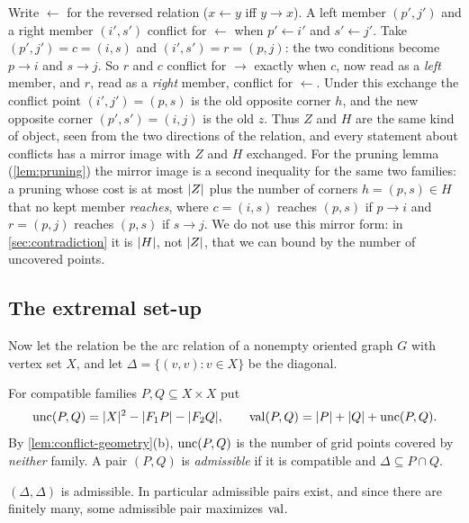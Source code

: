 \begin{remark}\label{rem:reversal}
Write $\leftarrow$ for the reversed relation ($x\leftarrow y$ iff $y\to x$).
A left member $(p',j')$ and a right member $(i',s')$ conflict for
$\leftarrow$ when $p'\leftarrow i'$ and $s'\leftarrow j'$. Take
$(p',j')=c=(i,s)$ and $(i',s')=r=(p,j)$: the two conditions become
$p\to i$ and $s\to j$. So $r$ and $c$ conflict for $\to$ exactly when
$c$, now read as a \emph{left} member, and $r$, read as a \emph{right}
member, conflict for $\leftarrow$. Under this exchange the conflict point
$(i',j')=(p,s)$ is the old opposite corner $h$, and the new opposite corner
$(p',s')=(i,j)$ is the old $z$. Thus $Z$ and $H$ are the same kind of object,
seen from the two directions of the relation, and every statement about
conflicts has a mirror image with $Z$ and $H$ exchanged. For the pruning
lemma (\cref{lem:pruning}) the mirror image is a second inequality for the
same two families: a pruning whose cost is at most $\lvert Z\rvert$ plus the number
of corners $h=(p,s)\in H$ that no kept member \emph{reaches}, where
$c=(i,s)$ reaches $(p,s)$ if $p\to i$ and $r=(p,j)$ reaches $(p,s)$ if
$s\to j$. We do not use this mirror form: in \cref{sec:contradiction} it is
$\lvert H\rvert$, not $\lvert Z\rvert$, that we can bound by the number of uncovered points.
\end{remark}

\subsection{The extremal set-up}

Now let the relation be the arc relation of a nonempty oriented graph $G$
with vertex set $X$, and let $\Delta=\{(v,v):v\in X\}$ be the diagonal.

\begin{definition}\label{def:value}
For compatible families $P,Q\subseteq X\times X$ put
\[
 \operatorname{unc}(P,Q)=\lvert X\rvert^2-\lvert F_1 P\rvert-\lvert F_2 Q\rvert,\qquad
 \operatorname{val}(P,Q)=\lvert P\rvert+\lvert Q\rvert+\operatorname{unc}(P,Q).
\]
By \cref{lem:conflict-geometry}(b), $\operatorname{unc}(P,Q)$ is the number of grid points
covered by \emph{neither} family. A pair $(P,Q)$ is \emph{admissible} if it
is compatible and $\Delta\subseteq P\cap Q$.
\end{definition}

\begin{lemma}\label{lem:diag-compatible}
$(\Delta,\Delta)$ is admissible. In particular admissible pairs exist, and since
there are finitely many, some admissible pair maximizes $\operatorname{val}$.
\end{lemma}

